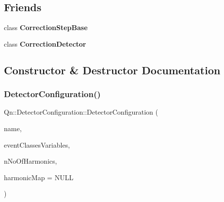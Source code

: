 \subsection*{Friends}
\begin{DoxyCompactItemize}
\item 
\mbox{\label{classQn_1_1DetectorConfiguration_afbb351f0a159c2e61159977b03f4b3c1}} 
class {\bfseries Correction\+Step\+Base}
\item 
\mbox{\label{classQn_1_1DetectorConfiguration_aaaec1af05216df7a0fa18215ef18023b}} 
class {\bfseries Correction\+Detector}
\end{DoxyCompactItemize}


\subsection{Constructor \& Destructor Documentation}
\mbox{\label{classQn_1_1DetectorConfiguration_ace49da97614ea3268a6483a5f0b4a1c5}} 
\subsubsection{\texorpdfstring{Detector\+Configuration()}{DetectorConfiguration()}}
{\footnotesize\ttfamily Qn\+::\+Detector\+Configuration\+::\+Detector\+Configuration (\begin{DoxyParamCaption}\item[{const char $\ast$}]{name,  }\item[{\mbox{\hyperlink{classQn_1_1EventClassVariablesSet}{Event\+Class\+Variables\+Set}} $\ast$}]{event\+Classes\+Variables,  }\item[{Int\+\_\+t}]{n\+No\+Of\+Harmonics,  }\item[{Int\+\_\+t $\ast$}]{harmonic\+Map = {\ttfamily NULL} }\end{DoxyParamCaption})}

